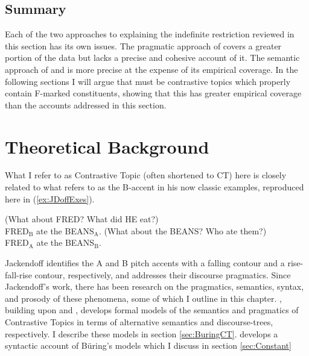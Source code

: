 \documentclass[
]{RCL}
\begin{document}
\subsection{Summary}
Each of the two approaches to explaining the indefinite restriction reviewed in this section has its own issues.
The pragmatic approach of \citet{mikkelsen2005copular} covers a greater portion of the data but lacks a precise and cohesive account of it.
The semantic approach of \citet{heycockkroch1999pseudocleft} and \citet{heycock2012specification} is more precise at the expense of its empirical coverage.
In the following sections I will argue that must be contrastive topics which properly contain F-marked constituents, showing that this has greater empirical coverage than the accounts addressed in this section.
\section{Theoretical Background}\label{sec:TheoryBackground}
What I refer to as Contrastive Topic (often shortened to CT) here is closely related to what \citet{jackendoff1972semantics} refers to as the B-accent in his now classic examples, reproduced here in (\ref{ex:JDoffExes}).
\begin{exe}
	\ex\label{ex:JDoffExes}
	\begin{xlist}
		\ex (What about FRED? What did HE eat?)\\
		FRED$_{\text{B}}$ ate the BEANS$_{\text{A}}$.
		\ex (What about the BEANS? Who ate them?)\\
		FRED$_{\text{A}}$ ate the BEANS$_{\text{B}}$.\hfill\citep[261]{jackendoff1972semantics}
	\end{xlist}
\end{exe}
Jackendoff identifies the A and B pitch accents with a falling contour and a rise-fall-rise contour, respectively, and addresses their discourse pragmatics.
Since Jackendoff's work, there has been research on the pragmatics, semantics, syntax, and prosody of these phenomena, some of which I outline in this chapter.
\citet{buring2003d}, building upon \citet{rooth1992theory} and \citet{roberts2012information}, develops formal models of the semantics and pragmatics of Contrastive Topics in terms of alternative semantics and discourse-trees, respectively. 
I describe these models in section \ref{sec:BuringCT}.
\citet{constant2014diss} develops a syntactic account of B\"uring's models which I discuss in section \ref{sec:Constant}
\end{document}

